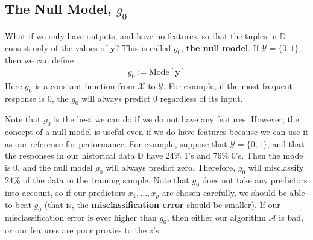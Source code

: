\documentclass[12pt, a4paper]{article}
\theoremstyle{definition}
\begin{document}
	\subsection*{The Null Model, $g_0$}
	What if we only have outputs, and have no features, so that the tuples in $\mathbb{D}$
	consist only of the values of $\mathbf{y}$? This is called $g_0$, \textbf{the null model}.
	If $\mathcal{Y}=\{0, 1\}$, then we can define
	\begin{align*}
		g_0 := \text{Mode}[\mathbf{y}]
	\end{align*}
	Here $g_0$ is a constant function from $\mathcal{X}$ to $\mathcal{Y}$. For example,
	if the most frequent response is $0$, the $g_0$ will always predict $0$ regardless
	of its input.
	
	Note that $g_0$ is the best we can do if we do not have any features. However, the concept
	of a null model is useful even if we do have features because we can use it as our reference
	for performance. For example, suppose that $\mathcal{Y}=\{0, 1\}$, and that the responses in our
	historical data $\mathbb{D}$ have $24\%$ $1$'s and $76\%$ $0$'s. Then the mode is $0$,
	and the null model $g_0$ will always predict zero. Therefore, $g_0$ will misclassify $24\%$
	of the data in the training sample. Note that $g_0$ does not take any predictors into account,
	so if our predictors $x_1,\ldots,x_p$
	are chosen carefully, we should be able to beat $g_0$ (that is, the \textbf{misclassification error}
	should be smaller). If our misclassification error is ever higher than $g_0$, then either
	our algorithm $\mathcal{A}$ is bad, or our features are poor proxies to the $z$'s.
	
\end{document}
